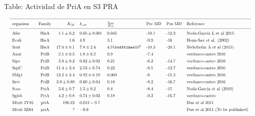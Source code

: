 \documentclass[12pt,twoside]{reedthesis}
\begin{document}
  Table: Actividad de PriA en S3 PRA \label{tab:PriAPRA}
  
  \[ 
  \resizebox{\columnwidth}{!}{%
  \begin{tabular}{ l c r l l l l l}
  \hline \\ [-1.5ex]
  organism  &Family & $K_M    $     & $k_{cat}$        & $\frac{k_{cat}}{K_M}$ &Pre MD & Pos MD & Reference  \\ [1ex]
  \hline \\ [-1.5ex]
  Afer        &HisA   & $1.1\pm0.2$   &$  0.05\pm0.001    $& 0.045                  &-10.1    &-12.3       &Noda-García L et al 2015\\ [1ex]
  Ecoli       &HisA   &$  1.6         $&$         4.9       $&3.1                   &-9.9   &-16       &Henn-Sax et al. (2002)\\ [1ex]
  Sent        &HisA   &$  17.0 \pm0.1 $&$ 7.8 \pm 2.4   $&$4.5 × 10^5          $&-10.3  &-20.1     &Söderholm A et al (2015)\\ [1ex]
  Aaur        &PriB   &$  2.1 \pm 0.5 $& $    1.8 \pm 0.2     $&0.9                   &-7.4   &              &verduzco-castro 2016\\ [1ex]
  Sipo        &PriB   &$  3.8\pm0.2     $&$0.82\pm0.02        $&0.21                  &-8.2     &-14.7       &verduzco-castro 2016\\ [1ex]
  SspC        &PriB   &$  11.4\pm3.4  $&$2.53\pm0.74      $&0.22                  &   -8.5    &-12.7     &verduzco-castro 2016\\ [1ex]
  SMg1        &PriB   &$  13.2\pm3.4  $&$0.92\pm0.19      $&0.069                 &-8     &-15.2     &verduzco-castro 2016\\ [1ex]
  Ssvi        &PriB   &$  3.9\pm0.89  $&$0.69\pm0.04      $&0.18                  &-8.2     &-16.7     &verduzco-castro 2016\\ [1ex]
  Scoe        &PriA   &$  3.6\pm0.7     $&$ 1.3\pm0.2     $  &0.4                   &-8.4   &-15       &Noda-García et al (2010)\\ [1ex]
  Sglob       &PriA   & $4.2\pm0.8     $ & $0.74\pm0.03    $   &0.18                  &-9.2     &-16.7       &verduzco-castro\\ [1ex]
  Mtub 2Y85   &priA   &$  19  0.23      $&$0.012  -9.7          $&                      &       &          &Due et al 2011\\ [1ex]
  Mtub 3ZS4   &priA   &$  ?                 $&$-9.9               $&                      &       &          &Due et al 2011 (To be published)\\ [1ex]

\end{tabular}}\]
\end{document}
